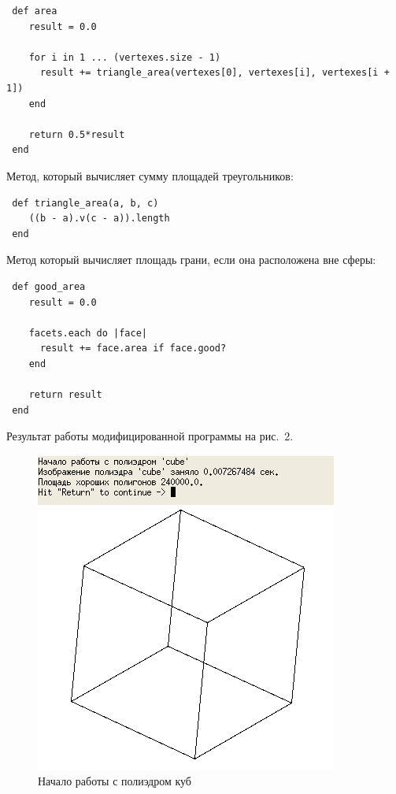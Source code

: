 \begin{small}
\begin{verbatim}
 def area
    result = 0.0

    for i in 1 ... (vertexes.size - 1)
      result += triangle_area(vertexes[0], vertexes[i], vertexes[i + 1])
    end

    return 0.5*result
 end 
\end{verbatim}
\end{small}

Метод, который вычисляет сумму площадей треугольников:

\begin{small}
\begin{verbatim}
 def triangle_area(a, b, c)
    ((b - a).v(c - a)).length
 end
\end{verbatim}
\end{small}

Метод который вычисляет площадь грани, если она расположена вне сферы:

\begin{small}
\begin{verbatim}
 def good_area
    result = 0.0

    facets.each do |face|
      result += face.area if face.good?
    end

    return result
 end
\end{verbatim}
\end{small}

Результат работы модифицированной программы на рис.~2.

\begin{figure}[ht!]
\begin{center}
\includegraphics[scale=0.6]{images/222}
\end{center}
\vspace*{-8mm}
\caption{Начало работы с полиэдром куб}\label{fig:term_2}
\end{figure}



